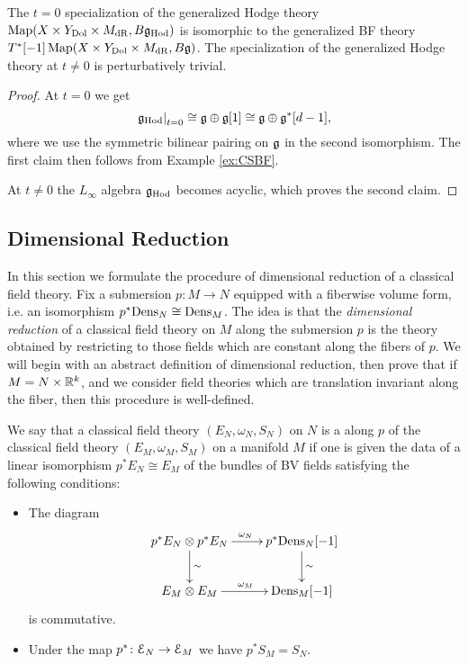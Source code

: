 \documentclass[10pt, oneside]{article}
\begin{document}
\begin{prop}
The $t=0$ specialization of the generalized Hodge theory $\operatorname{Map}(X\times Y_{\mathrm{Dol}}\times M_{\mathrm{dR}}, B \mathfrak g_{\mathrm{Hod}})$ is isomorphic to the generalized BF theory $T^*[-1]\operatorname{Map}(X\times Y_{\mathrm{Dol}}\times M_{\mathrm{dR}}, B \mathfrak g)$. The specialization of the generalized Hodge theory at $t\neq 0$ is perturbatively trivial.
\label{prop:Hodgetheoryspecialization}
\end{prop}

\begin{proof}
At $t=0$ we get
\[\left.\mathfrak g_{\mathrm{Hod}}\right|_{t=0}\cong \mathfrak g\oplus \mathfrak g[1]\cong \mathfrak g\oplus \mathfrak g^*[d-1],\]
where we use the symmetric bilinear pairing on $\mathfrak g$ in the second isomorphism. The first claim then follows from Example \ref{ex:CSBF}.

At $t\neq 0$ the $L_\infty$ algebra $\mathfrak g_{\mathrm{Hod}}$ becomes acyclic, which proves the second claim.
\end{proof}

\subsection{Dimensional Reduction} \label{dim_red_section}

In this section we formulate the procedure of dimensional reduction of a classical field theory. Fix a submersion $p\colon M\rightarrow N$ equipped with a fiberwise volume form, i.e. an isomorphism $p^*\mathrm{Dens}_N\cong \mathrm{Dens}_M$.  The idea is that the \emph{dimensional reduction} of a classical field theory on $M$ along the submersion $p$ is the theory obtained by restricting to those fields which are constant along the fibers of $p$.  We will begin with an abstract definition of dimensional reduction, then prove that if $M = N \times \mathbb R^k$, and we consider field theories which are translation invariant along the fiber, then this procedure is well-defined.

\begin{definition}
We say that a classical field theory $(E_N, \omega_N, S_N)$ on $N$ is a  along $p$ of the classical field theory $(E_M, \omega_M, S_M)$ on a manifold $M$ if one is given the data of a linear isomorphism $p^* E_N\cong E_M$ of the bundles of BV fields satisfying the following conditions:
\begin{itemize}
\item The diagram
\[
\xymatrix{
p^* E_N\otimes p^* E_N \ar^{\omega_N}[r] \ar^{\sim}[d] & p^*\Dens_N[-1] \ar^{\sim}[d] \\
E_M\otimes E_M \ar^{\omega_M}[r] & \Dens_M[-1]
}
\]
is commutative.

\item Under the map $p^*\colon \mathcal E_N\rightarrow \mathcal E_M$ we have $p^* S_M = S_N$.
\end{itemize}
\end{definition}
\end{document}
